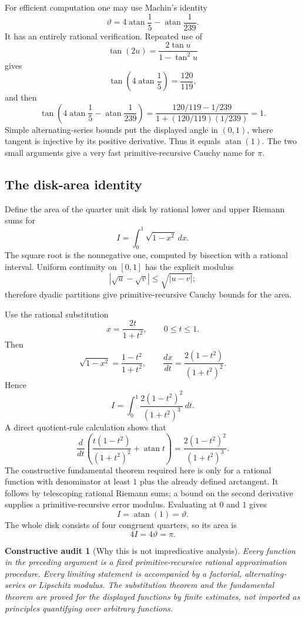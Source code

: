 \documentclass[11pt]{article}
\newtheorem{audit}[theorem]{Constructive audit}
\newcommand{\atan}{\operatorname{atan}}
\begin{document}
For efficient computation one may use Machin's identity
\[
  \vartheta=4\atan\frac15-\atan\frac1{239}.
\]
It has an entirely rational verification.  Repeated use of
\[
  \tan(2u)=\frac{2\tan u}{1-\tan^2u}
\]
gives
\[
  \tan\left(4\atan\frac15\right)=\frac{120}{119},
\]
and then
\[
  \tan\left(4\atan\frac15-\atan\frac1{239}\right)
  =\frac{120/119-1/239}{1+(120/119)(1/239)}=1.
\]
Simple alternating-series bounds put the displayed angle in $(0,1)$, where tangent is injective by its positive derivative.  Thus it equals $\atan(1)$.  The two small arguments give a very fast primitive-recursive Cauchy name for $\pi$.

\subsection{The disk-area identity}

Define the area of the quarter unit disk by rational lower and upper Riemann sums for
\[
  I=\int_0^1\sqrt{1-x^2}\,dx.
\]
The square root is the nonnegative one, computed by bisection with a rational interval.  Uniform continuity on $[0,1]$ has the explicit modulus
\[
  |\sqrt{u}-\sqrt{v}|\le\sqrt{|u-v|};
\]
therefore dyadic partitions give primitive-recursive Cauchy bounds for the area.

Use the rational substitution
\[
  x=\frac{2t}{1+t^2},\qquad 0\le t\le1.
\]
Then
\[
  \sqrt{1-x^2}=\frac{1-t^2}{1+t^2},\qquad
  \frac{dx}{dt}=\frac{2(1-t^2)}{(1+t^2)^2}.
\]
Hence
\[
  I=\int_0^1\frac{2(1-t^2)^2}{(1+t^2)^3}\,dt.
\]
A direct quotient-rule calculation shows that
\[
  \frac{d}{dt}\left(
    \frac{t(1-t^2)}{(1+t^2)^2}+\atan t
  \right)
  =\frac{2(1-t^2)^2}{(1+t^2)^3}.
\]
The constructive fundamental theorem required here is only for a rational function with denominator at least $1$ plus the already defined arctangent.  It follows by telescoping rational Riemann sums; a bound on the second derivative supplies a primitive-recursive error modulus.  Evaluating at $0$ and $1$ gives
\[
  I=\atan(1)=\vartheta.
\]
The whole disk consists of four congruent quarters, so its area is
\[
  4I=4\vartheta=\pi.
\]

\begin{audit}[Why this is not impredicative analysis]
Every function in the preceding argument is a fixed primitive-recursive rational approximation procedure.  Every limiting statement is accompanied by a factorial, alternating-series or Lipschitz modulus.  The substitution theorem and the fundamental theorem are proved for the displayed functions by finite estimates, not imported as principles quantifying over arbitrary functions.
\end{audit}
\end{document}
